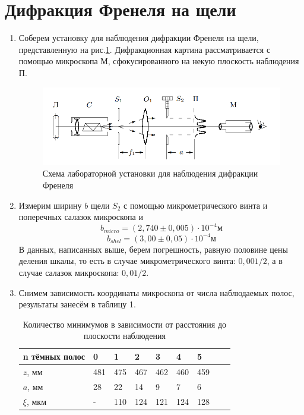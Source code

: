 \documentclass[a4paper]{article}
\begin{document}
\section*{Дифракция Френеля на щели}
\begin{enumerate}
    \item Соберем установку для наблюдения дифракции Френеля на щели, представленную на рис.\ref{fig:fren}. Дифракционная картина рассматривается с помощью микроскопа М, сфокусированного на некую плоскость наблюдения П. 
\begin{figure}[h]
    \centering
    \includegraphics[width=15cm]{setup_frenel.PNG}
    \caption{Схема лабораторной установки для наблюдения дифракции Френеля}
    \label{fig:fren}
\end{figure}

\item Измерим ширину $b$ щели $S_2$ с помощью микрометрического винта и поперечных салазок микроскопа и 
\[b_{micro} = (2,740 \pm 0,005) \cdot 10^{-4} \text{м}\]
\[b_{shel} = (3,00 \pm 0,05) \cdot 10^{-4} \text{м}\]
В данных, написанных выше, берем погрешность, равную половине цены деления шкалы, то есть в случае микрометрического винта: $0,001/2$, а в случае салазок микроскопа: $0,01/2$.

\item Снимем зависимость координаты микроскопа от числа наблюдаемых полос, результаты занесём в таблицу 1.


\begin{table}[h]
    \centering
    \begin{center}
    \caption{Количество минимумов в зависимости от расстояния до плоскости наблюдения}
    \end{center}
    \vspace{0.1cm}
    \label{fren_data}
    \begin{tabular}{ |p{2.5cm}||p{0.5cm}|p{0.5cm}|p{0.5cm}|p{0.5cm}|p{0.5cm}|p{0.5cm}|p{0.5cm}|p{0.5cm}|}
 \hline
n тёмных полос & 0 & 1 & 2 & 3 & 4 & 5\\
 \hline
 $z$, мм & 481 & 475 & 467 & 462 & 460 & 459 \\
 \hline
 $a$, мм & 28 & 22 & 14 & 9 & 7 & 6 \\
 \hline
 $\xi$, мкм & - & 110 & 124 & 121 & 124 & 128 \\ 
 \hline
 

\end{tabular}
\end{table}
\end{enumerate}
\end{document}

